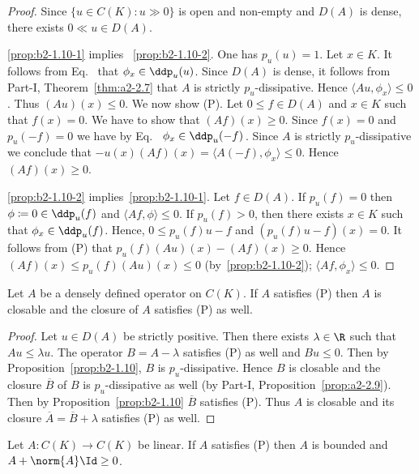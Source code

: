 \begin{proof}
Since $\{u \in C(K) \colon u \gg 0\}$ is open and non-empty and $D(A)$ is dense, there exists $0 \ll u \in D(A)$.

\ref{prop:b2-1.10-1} implies ~\ref{prop:b2-1.10-2}.
One has $p_{u}(u) = 1$.
Let $x \in K$.
It follows from Eq.~ that $\phi_{x} \in \ddp_{u}(u)$.
Since $D(A)$ is dense, it follows from Part-I, Theorem~\ref{thm:a2-2.7}
that $A$ is strictly $p_{u}$-dissipative.
Hence $\langle Au,\phi_{x} \rangle \leq 0$.
Thus $(Au)(x) \leq 0$.
We now show (P).
Let $0 \leq f \in D(A)$ and $x \in K$ such that $f(x) = 0$.
We have to show that $(Af)(x) \geq 0$.
Since $f(x) = 0$ and $p_{u}(-f) = 0$ we have by Eq.~  $\phi_{x} \in \ddp_{u}(-f)$\,.
Since $A$ is strictly $p_{u}$-dissipative we conclude that $-u(x)(Af)(x) = \langle A(-f),\phi_{x} \rangle \leq 0$.
Hence $(Af)(x) \geq 0$.

\ref{prop:b2-1.10-2} implies~\ref{prop:b2-1.10-1}.
Let $f \in D(A)$.
If\/ $p_{u}(f) = 0$ then $\phi \coloneqq 0 \in \ddp_{u}(f)$ and $\langle Af,\phi \rangle \leq 0$.
If\/ $p_{u}(f) > 0$, then there exists $x \in K$ such that $\phi_{x} \in \ddp_{u}(f)$.
Hence, $0 \leq p_{u}(f)u - f$ and $(p_{u}(f)u - f)(x) = 0$.
It follows from (P) that $p_{u}(f)(Au)(x) - (Af)(x) \geq 0$.
Hence $(Af)(x) \leq p_{u}(f)(Au)(x) \leq 0$ (by~\ref{prop:b2-1.10-2}); \ie  $\langle Af,\phi_{x} \rangle \leq 0$.
\end{proof}

\begin{corollary}\label{cor:b2-1.11}
Let $A$ be a densely defined operator on $C(K)$.
If\/ $A$ satisfies (P) then $A$ is closable and the closure of\/ $A$ satisfies (P) as well.
\end{corollary}
\begin{proof}%
Let $u \in D(A)$ be strictly positive.
Then there exists $\lambda \in \R$ such that $Au \leq \lambda u$.
The operator $B = A - \lambda$ satisfies (P) as well and $Bu \leq 0$.
Then by Proposition~\ref{prop:b2-1.10}, $B$ is $p_{u}$-dissipative.
Hence $B$ is closable and the closure $\overline{B}$ of\/ $B$ is $p_{u}$-dissipative as well (by Part-I, Proposition~\ref{prop:a2-2.9}).
Then by Proposition~\ref{prop:b2-1.10} $\overline{B}$ satisfies (P).
Thus $A$ is closable and its closure $\overline{A} = \overline{B} + \lambda$ satisfies (P) as well.
\end{proof}

\begin{corollary}\label{cor:b2-1.12}
Let $A \colon C(K) \to C(K)$ be linear.
If\/ $A$ satisfies (P) then $A$ is bounded and $A + \norm{A}\Id \geq 0$.
\end{corollary}

